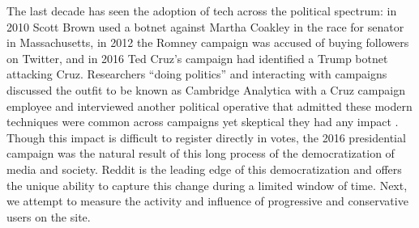 The last decade has seen the adoption of tech across the political spectrum: in 2010 Scott Brown used a botnet against Martha Coakley in the race for senator in Massachusetts, in 2012 the Romney campaign was accused of buying followers on Twitter, and in 2016 Ted Cruz's campaign had identified a Trump botnet attacking Cruz.
Researchers ``doing politics'' and interacting with campaigns discussed the outfit to be known as Cambridge Analytica with a Cruz campaign employee and interviewed another political operative that admitted these modern techniques were common across campaigns yet skeptical they had any impact \cite[pp. 194-195]{woolley2018}.
Though this impact is difficult to register directly in votes, the 2016 presidential campaign was the natural result of this long process of the democratization of media and society.
Reddit is the leading edge of this democratization and offers the unique ability to capture this change during a limited window of time.
Next, we attempt to measure the activity and influence of progressive and conservative users on the site.